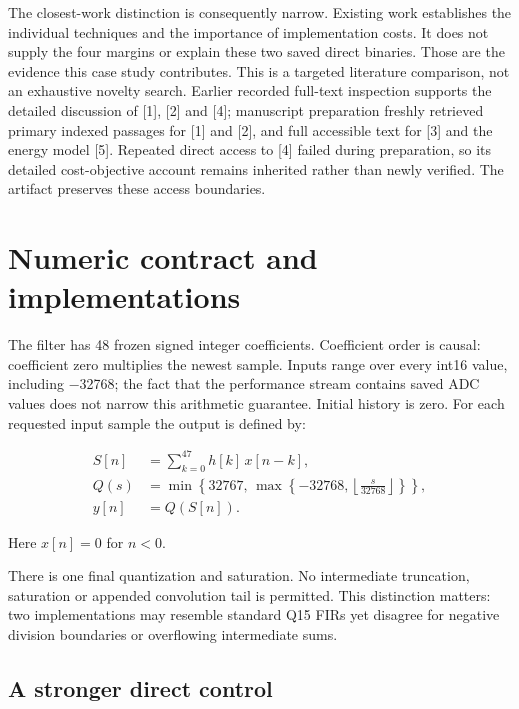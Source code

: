\documentclass[conference]{IEEEtran}
\begin{document}
The closest-work distinction is consequently narrow. Existing work
establishes the individual techniques and the importance of
implementation costs. It does not supply the four margins or explain
these two saved direct binaries. Those are the evidence this case study
contributes. This is a targeted literature comparison, not an exhaustive
novelty search. Earlier recorded full-text inspection supports the
detailed discussion of {[}1{]}, {[}2{]} and {[}4{]}; manuscript
preparation freshly retrieved primary indexed passages for {[}1{]} and
{[}2{]}, and full accessible text for {[}3{]} and the energy model
{[}5{]}. Repeated direct access to {[}4{]} failed during preparation, so
its detailed cost-objective account remains inherited rather than newly
verified. The artifact preserves these access boundaries.

\section{Numeric contract and implementations}\label{numeric-contract-and-implementations}

The filter has 48 frozen signed integer coefficients. Coefficient order
is causal: coefficient zero multiplies the newest sample. Inputs range
over every int16 value, including −32768; the fact that the performance
stream contains saved ADC values does not narrow this arithmetic
guarantee. Initial history is zero. For each requested input sample the
output is defined by:

\[
\begin{aligned}
S[n] &= \sum_{k=0}^{47} h[k]\,x[n-k],\\
Q(s) &= \min\!\left\{32767,\,
  \max\!\left\{-32768,\left\lfloor\frac{s}{32768}\right\rfloor\right\}\right\},\\
y[n] &= Q(S[n]).
\end{aligned}
\]

Here \(x[n]=0\) for \(n<0\).

There is one final quantization and saturation. No intermediate
truncation, saturation or appended convolution tail is permitted. This
distinction matters: two implementations may resemble standard Q15 FIRs
yet disagree for negative division boundaries or overflowing
intermediate sums.

\subsection{A stronger direct control}\label{a-stronger-direct-control}
\end{document}
